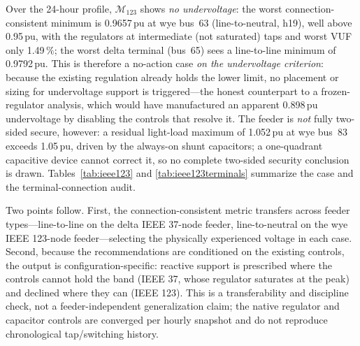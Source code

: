 \documentclass{ieeeaccess}
\providecommand{\percent}{\%}
\newcommand{\SI}[2]{#1\,\ensuremath{\mathrm{#2}}}
\begin{document}
Over the 24-hour profile, $\mathcal M_{123}$ shows \emph{no undervoltage}: the worst
connection-consistent minimum is \SI{0.9657}{pu} at wye bus~63 (line-to-neutral,
h19), well above \SI{0.95}{pu}, with the regulators at intermediate (not saturated)
taps and worst VUF only \SI{1.49}{\percent}; the worst delta terminal (bus~65) sees
a line-to-line minimum of \SI{0.9792}{pu}. This is therefore a no-action case \emph{on the undervoltage criterion}: because the
existing regulation already holds the lower limit, no placement or sizing for
undervoltage support is triggered---the honest counterpart to a frozen-regulator
analysis, which would have manufactured an apparent \SI{0.898}{pu} undervoltage by
disabling the controls that resolve it. The feeder is \emph{not} fully two-sided
secure, however: a residual light-load maximum of \SI{1.052}{pu} at wye bus~83
exceeds \SI{1.05}{pu}, driven by the always-on shunt capacitors; a one-quadrant
capacitive device cannot correct it, so no complete two-sided security conclusion is
drawn. Tables~\ref{tab:ieee123} and \ref{tab:ieee123terminals} summarize the case
and the terminal-connection audit.

Two points follow. First, the connection-consistent metric transfers across feeder
types---line-to-line on the delta IEEE 37-node feeder, line-to-neutral on the wye
IEEE 123-node feeder---selecting the physically experienced voltage in each case.
Second, because the recommendations are conditioned on the existing controls, the
output is configuration-specific: reactive support is prescribed where the controls
cannot hold the band (IEEE 37, whose regulator saturates at the peak) and declined
where they can (IEEE 123). This is a transferability and discipline check, not a
feeder-independent generalization claim; the native regulator and capacitor controls
are converged per hourly snapshot and do not reproduce chronological tap/switching
history.

\end{document}

